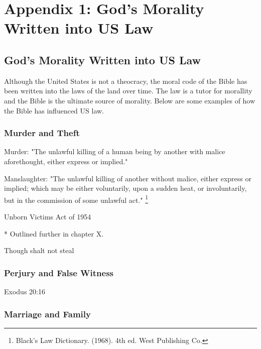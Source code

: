 \chapter{Appendix 1: God's Morality Written into US Law}
\section{God's Morality Written into US Law}

Although the United States is not a theocracy, the moral code of the Bible has been written into the laws of the land over time. The law is a tutor for morallity and the Bible is the ultimate source of morality.
Below are some examples of how the Bible has influenced US law.

\subsection{Murder and Theft}
Murder: "The unlawful killing of a human being by another with malice aforethought, either
express or implied."
\vspace{1\baselineskip}

\noindent Manslaughter: "The unlawful killing of another without malice, either express or implied; which may be either voluntarily, upon a sudden heat, or involuntarily, but in the commission of some unlawful act." \footnote{Black’s Law Dictionary. (1968). 4th ed. West Publishing Co.}

\vspace{2\baselineskip}


Unborn Victims Act of 1954


* Outlined further in chapter X. 



Though shalt not steal

\subsection{Perjury and False Witness}
Exodus 20:16



\subsection{Marriage and Family}


